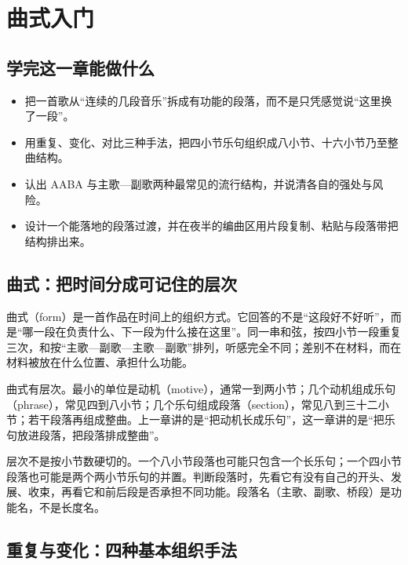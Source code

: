 \clearpage
\chapter{曲式入门}


\label{sec:form-basics}

\section*{学完这一章能做什么}
\begin{itemize}
  \item 把一首歌从“连续的几段音乐”拆成有功能的段落，而不是只凭感觉说“这里换了一段”。
  \item 用重复、变化、对比三种手法，把四小节乐句组织成八小节、十六小节乃至整曲结构。
  \item 认出 AABA 与主歌—副歌两种最常见的流行结构，并说清各自的强处与风险。
  \item 设计一个能落地的段落过渡，并在夜半的编曲区用片段复制、粘贴与段落带把结构排出来。
\end{itemize}

\section{曲式：把时间分成可记住的层次}

曲式（form）是一首作品在时间上的组织方式。它回答的不是“这段好不好听”，而是“哪一段在负责什么、下一段为什么接在这里”。同一串和弦，按四小节一段重复三次，和按“主歌—副歌—主歌—副歌”排列，听感完全不同；差别不在材料，而在材料被放在什么位置、承担什么功能。

曲式有层次。最小的单位是动机（motive），通常一到两小节；几个动机组成乐句（phrase），常见四到八小节；几个乐句组成段落（section），常见八到三十二小节；若干段落再组成整曲。上一章讲的是“把动机长成乐句”，这一章讲的是“把乐句放进段落，把段落排成整曲”。

层次不是按小节数硬切的。一个八小节段落也可能只包含一个长乐句；一个四小节段落也可能是两个两小节乐句的并置。判断段落时，先看它有没有自己的开头、发展、收束，再看它和前后段是否承担不同功能。段落名（主歌、副歌、桥段）是功能名，不是长度名。

\section{重复与变化：四种基本组织手法}

